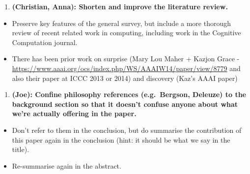 \begin{enumerate}
\def\labelenumi{\arabic{enumi}.}
\setcounter{enumi}{10}
\itemsep1pt\parskip0pt
\item
  \textbf{(Christian, Anna): Shorten and improve the literature review.}
\end{enumerate}

\begin{itemize}
\itemsep1pt\parskip0pt
\item
  Preserve key features of the general survey, but include a more
  thorough review of recent related work in computing, including work in
  the Cognitive Computation journal.
\item
  There has been prior work on surprise (Mary Lou Maher + Kazjon Grace -
  \href{http\%20s://www.google.com/url?q=https\%3A\%2F\%2Fwww.aaai.org\%2Focs\%2Findex.php\%2F\%20WS\%2FAAAIW14\%2Fpaper\%2Fview\%2F8779\&sa=D\&sntz=1\&usg=AFQjCNGFIWctyzoi4ZSfD\%20oIrAznrL4Be0g}{https://www.aaai.org/ocs/index.php/WS/AAAIW14/paper/view/8779}
  and also their paper at ICCC 2013 or 2014) and discovery (Kaz's AAAI
  paper)
\end{itemize}

\begin{enumerate}
\def\labelenumi{\arabic{enumi}.}
\setcounter{enumi}{11}
\itemsep1pt\parskip0pt
\item
  \textbf{(Joe): Confine philosophy references (e.g.~Bergson, Deleuze)
  to the background section so that it doesn't confuse anyone about what
  we're actually offering in the paper.}
\end{enumerate}

\begin{itemize}
\itemsep1pt\parskip0pt
\item
  Don't refer to them in the conclusion, but do summarise the
  contribution of this paper again in the conclusion (hint: it should be
  what we say in the title).
\item
  Re-summarise again in the abstract.
\end{itemize}
